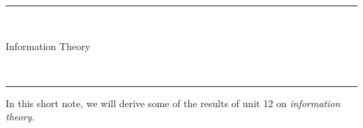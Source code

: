 \documentclass[a4paper]{article}
\theoremstyle{definition}
\begin{document}
\fancyhead[C]{}
\hrule \medskip
\begin{minipage}{0.295\textwidth}
    \raggedright
    \hfill\\
\end{minipage}
\begin{minipage}{0.4\textwidth}
    \centering
    \large
    Information Theory\\
\end{minipage}
\begin{minipage}{0.295\textwidth}
    \raggedleft
    \hfill\\
\end{minipage}
\medskip\hrule
\bigskip
 
In this short note, we will derive some of the results of unit 12 on {\em information theory}. 
\end{document}
